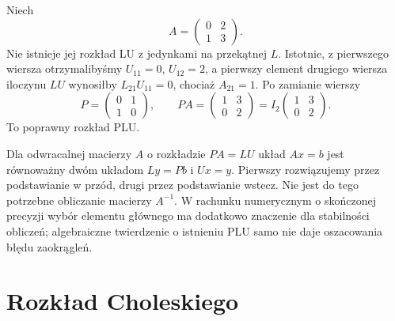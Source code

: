 \begin{przyklad}
\label{prz:lin15-pivot}
Niech
\[
 A=\begin{pmatrix}0&2\\1&3\end{pmatrix}.
\]
Nie istnieje jej rozkład LU
z jedynkami na przekątnej \(L\).
Istotnie, z pierwszego wiersza
otrzymalibyśmy
\(U_{11}=0\), \(U_{12}=2\),
a pierwszy element drugiego
wiersza iloczynu \(LU\)
wynosiłby \(L_{21}U_{11}=0\),
chociaż \(A_{21}=1\).
Po zamianie wierszy
\[
 P=\begin{pmatrix}0&1\\1&0\end{pmatrix},
 \qquad
 PA=\begin{pmatrix}1&3\\0&2\end{pmatrix}
 =I_2\begin{pmatrix}1&3\\0&2\end{pmatrix}.
\]
To poprawny rozkład PLU.
\end{przyklad}

\begin{uwaga}
\label{rem:lin15-triangular}
Dla odwracalnej macierzy \(A\)
o rozkładzie \(PA=LU\)
układ \(Ax=b\) jest równoważny
dwóm układom
\(Ly=Pb\) i \(Ux=y\).
Pierwszy rozwiązujemy
przez podstawianie w przód,
drugi przez podstawianie wstecz.
Nie jest do tego potrzebne
obliczanie macierzy \(A^{-1}\).
W rachunku numerycznym o skończonej
precyzji wybór elementu głównego
ma dodatkowo znaczenie dla stabilności
obliczeń; algebraiczne twierdzenie
o istnieniu PLU samo nie daje
oszacowania błędu zaokrągleń.
\end{uwaga}

\section{Rozkład Choleskiego}
\label{sec:lin15-cholesky}

